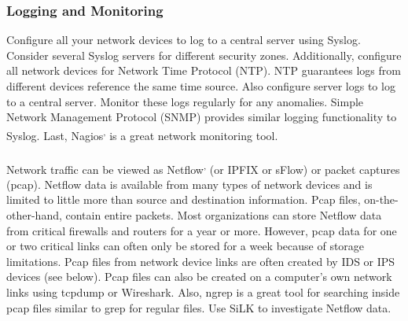 \subsubsection{Logging and Monitoring}
Configure all your network devices to log to a central server using Syslog. Consider several Syslog servers for different security zones. Additionally, configure all network devices for Network Time Protocol (NTP). NTP guarantees logs from different devices reference the same time source. Also configure server logs to log to a central server. Monitor these logs regularly for any anomalies. Simple Network Management Protocol (SNMP) provides similar logging functionality to Syslog. Last, Nagios\textsuperscript{,} is a great network monitoring tool.\\\\
Network traffic can be viewed as Netflow\textsuperscript{,} (or IPFIX or sFlow) or packet captures (pcap). Netflow data is available from many types of network devices and is limited to little more than source and destination information. Pcap files, on-the-other-hand, contain entire packets. Most organizations can store Netflow data from critical firewalls and routers for a year or more. However, pcap data for one or two critical links can often only be stored for a week because of storage limitations. Pcap files from network device links are often created by IDS or IPS devices (see below). Pcap files can also be created on a computer's own network links using tcpdump or Wireshark. Also, ngrep is a great tool for searching inside pcap files similar to grep for regular files. Use SiLK to investigate Netflow data.
